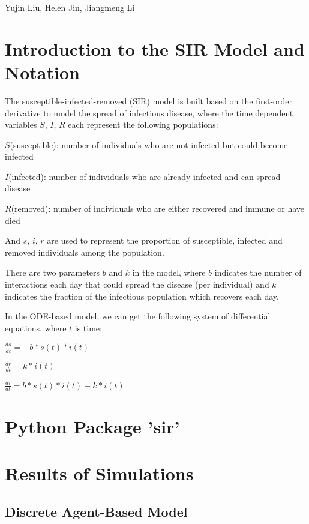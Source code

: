 \documentclass{article}
\begin{document}
\begin{titlepage}
  \begin{center}
  \huge{Yujin Liu, Helen Jin, Jiangmeng Li}
  \end{center}


\end{titlepage}


\section{Introduction to the SIR Model and Notation}
The susceptible-infected-removed (SIR) model is built based on the first-order derivative to model the spread of infectious disease, where the time dependent variables $S$, $I$, $R$ each represent the following populations:

$S$(susceptible): number of individuals who are not infected but could become infected

$I$(infected): number of individuals who are already infected and can spread disease

$R$(removed): number of individuals who are either recovered and immune or have died
    
And $s$, $i$, $r$ are used to represent the proportion of susceptible, infected and removed individuals among the population. 

There are two parameters $b$ and $k$ in the model, where $b$ indicates the number of interactions each day that could spread the disease (per individual) and $k$ indicates the fraction of the infectious population which recovers each day. 

In the ODE-based model, we can get the following system of differential equations, where $t$ is time:

$\frac{ds}{dt} = -b * s(t) * i(t)$

$\frac{dr}{dt} = k * i(t)$

$\frac{di}{dt} = b * s(t) * i(t) - k * i(t)$
\section{Python Package 'sir'}


\section{Results of Simulations}
\subsection{Discrete Agent-Based Model}
\end{document}
